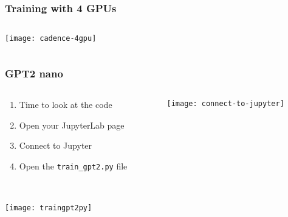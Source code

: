 \documentclass[
	notes=none,
	aspectratio=169
]{beamer}
\begin{document}

\begin{frame}
\frametitle{Training with 4 GPUs}

\begin{columns}[T]
\begin{column}[T]{1.0\textwidth}
\setlength{\parskip}{0.5em}

\vspace{0.0cm}
\texttt{[image: cadence-4gpu]}


\end{column}
\end{columns}

\end{frame}
\note{
}


\begin{frame}
\frametitle{GPT2 nano}

\begin{columns}[T]
\begin{column}[T]{0.6\textwidth}
\setlength{\parskip}{0.5em}

\vspace{1.0cm}
\begin{enumerate}
\setlength{\parskip}{0.5em}
\item Time to look at the code
\item Open your JupyterLab page
\item Connect to Jupyter
\item Open the {\tt train\_gpt2.py} file
\end{enumerate}

\end{column}
\begin{column}[T]{0.3\textwidth}
\setlength{\parskip}{0.5em}

\vspace{0.0cm}
\texttt{[image: connect-to-jupyter]}

\end{column}
\end{columns}

\end{frame}
\note{
}


\begin{frame}
\frametitle{}

\begin{columns}[T]
\begin{column}[T]{1.0\textwidth}
\setlength{\parskip}{0.5em}

\vspace{0.0cm}
\texttt{[image: traingpt2py]}


\end{column}
\end{columns}

\end{frame}
\note{
}
\end{document}
